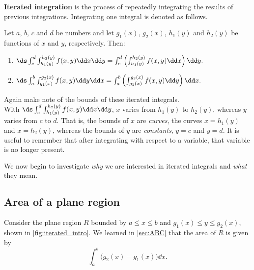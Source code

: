 \begin{definition}\label{def:iterated_integral}
\textbf{Iterated integration} is the process of repeatedly integrating the results of previous integrations. Integrating one integral is denoted as follows.\bigskip

Let $a$, $b$, $c$ and $d$ be numbers and let $g_1(x)$, $g_2(x)$, $h_1(y)$ and $h_2(y)$ be functions of $x$ and $y$, respectively. Then:
\begin{enumerate}
	\item $\ds \int_c^d\int_{h_1(y)}^{h_2(y)} f(x,y)\dd x\dd y = \int_c^d\left(\int_{h_1(y)}^{h_2(y)} f(x,y)\dd x\right)\dd y.$
	\item $\ds \int_a^b\int_{g_1(x)}^{g_2(x)} f(x,y)\dd y\dd x = \int_a^b\left(\int_{g_1(x)}^{g_2(x)} f(x,y)\dd y\right)\dd x.$
\end{enumerate}
\end{definition}

Again make note of the bounds of these iterated integrals.\\
With $\ds \int_c^d\int_{h_1(y)}^{h_2(y)} f(x,y)\dd x\dd y$, $x$ varies from $h_1(y)$ to $h_2(y)$, whereas $y$ varies from $c$ to $d$. That is, the bounds of $x$ are \emph{curves}, the curves $x=h_1(y)$ and $x=h_2(y)$, whereas the bounds of $y$ are \emph{constants}, $y=c$ and $y=d$. It is useful to remember that
after integrating with respect to a variable, that variable is no longer present.

We now begin to investigate \emph{why} we are interested in iterated integrals and \emph{what} they mean.

\subsection{Area of a plane region}

Consider the plane region $R$ bounded by $a\leq x\leq b$ and $g_1(x)\leq y\leq g_2(x)$, shown in \autoref{fig:iterated_intro}. We learned in \autoref{sec:ABC} that the area of $R$ is given by 
\[\int_a^b \bigl(g_2(x)-g_1(x)\bigr)\dd x.\]

